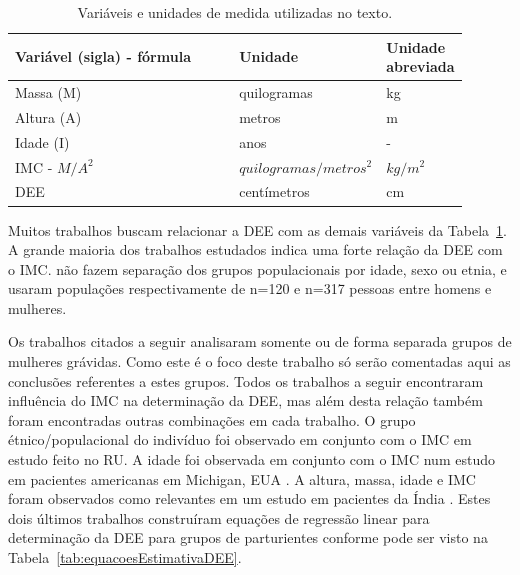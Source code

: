 \begin{table}[!ht]
\begin{center}
\caption{Variáveis e unidades de medida utilizadas no texto.}
\label{tab:variaveisUnidades}
\begin{tabular}{|p{0.52\linewidth}|p{0.25\linewidth}|p{0.13\linewidth}|}
\hline
\textbf{Variável (sigla) - fórmula} & \textbf{Unidade} & \textbf{Unidade abreviada}\\
\hline\hline
Massa (M) & quilogramas & kg \\
Altura (A) & metros & m \\
Idade (I) & anos & - \\
\acrfull{IMC} - $M/A^2$ & $quilogramas/metros^2$ & $kg/m^2$ \\
\acrfull{DEE} & centímetros & cm \\
\hline
\end{tabular}
\end{center}
\end{table}

Muitos trabalhos buscam relacionar a \acrfull{DEE} com as demais variáveis da Tabela~\ref{tab:variaveisUnidades}. A grande maioria dos trabalhos estudados indica uma forte relação da \acrshort{DEE} com o \acrshort{IMC}. \textcite{Adegboye2017, Galbraith2018} não fazem separação dos grupos populacionais por idade, sexo ou etnia, e usaram populações respectivamente de n=120 e n=317 pessoas entre homens e mulheres.

Os trabalhos citados a seguir analisaram somente ou de forma separada grupos de mulheres grávidas. Como este é o foco deste trabalho só serão comentadas aqui as conclusões referentes a estes grupos. Todos os trabalhos a seguir encontraram influência do \acrshort{IMC} na determinação da \acrshort{DEE}, mas além desta relação também foram encontradas outras combinações em cada trabalho. O grupo étnico/populacional do indivíduo foi observado em conjunto com o \acrshort{IMC} em \textcite{Sharma2011} estudo feito no \acrfull{RU}. A idade foi observada em conjunto com o \acrshort{IMC} num estudo em pacientes americanas em Michigan, EUA \cite{Clinkscales2007}. A altura, massa, idade e \acrshort{IMC} foram observados como relevantes em um estudo em pacientes da Índia \cite{Hazarika2016}. Estes dois últimos trabalhos construíram equações de regressão linear para determinação da \acrshort{DEE} para grupos de parturientes conforme pode ser visto na Tabela~\ref{tab:equacoesEstimativaDEE}.

